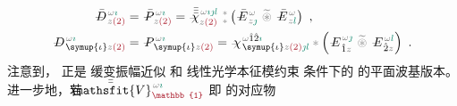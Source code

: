 \begin{subequations} \label{eq:DP^(2)-plane_wave_basis-p_pp}
\begin{align}
	\Xint{\mathcolor{gray}{-}}{30}{\bar{D}}^{\;\! \mathcolor{gray}{\omega} \textcolor{PineGreen}{\imath}}_{\;\! \mathcolor{gray}{z} \textcolor{Maroon}{(2)}} &= \Xint{\mathcolor{gray}{-}}{30}{\bar{P}}^{\;\! \mathcolor{gray}{\omega} \textcolor{PineGreen}{\imath}}_{\;\! \mathcolor{gray}{z} \textcolor{Maroon}{(2)}} = \Xint{{}^{}_{\mathcolor{gray}{-}}}{23}{\bar{\bar{\bar{\chi}}}}^{\;\! \mathcolor{gray}{\omega} \textcolor{PineGreen}{\imath \jmath l}}_{\mathcolor{gray}{z} \textcolor{Maroon}{(2)}} ~{}^{\mathcolor{gray}{*}}_{\mathcolor{gray}{*}} \left( \Xint{\mathcolor{gray}{-}}{295}{\bar{E}}^{\;\!\mathcolor{gray}{\omega}}_{\;\! \mathcolor{gray}{z} \textcolor{PineGreen}{\jmath} } ~\mathcolor{gray}{\widetilde \circledast}~ \Xint{\mathcolor{gray}{-}}{295}{\bar{E}}^{\;\!\mathcolor{gray}{\omega}}_{\;\! \mathcolor{gray}{z} \textcolor{PineGreen}{l} } \right) ~, \label{eq:vec-DP^(2)-plane_wave_basis-p_pp} \\
	\Xint{\mathcolor{gray}{-}}{30}{D}^{\;\! \mathcolor{gray}{\omega} \textcolor{PineGreen}{\imath}}_{\;\! \symup{\iota}\mathcolor{gray}{z} \textcolor{Maroon}{(2)}} &= \Xint{\mathcolor{gray}{-}}{30}{P}^{\;\! \mathcolor{gray}{\omega} \textcolor{PineGreen}{\imath}}_{\;\! \symup{\iota}\mathcolor{gray}{z} \textcolor{Maroon}{(2)}} = \Xint{{}^{}_{\mathcolor{gray}{-}}}{23}{\chi}^{\;\! \mathcolor{gray}{\omega} \hat{1} \hat{2} \textcolor{PineGreen}{\imath}}_{\;\! \symup{\iota} \mathcolor{gray}{z} \textcolor{Maroon}{(2)} \textcolor{PineGreen}{\jmath l}} \mathcolor{gray}{*} \left( \Xint{\mathcolor{gray}{-}}{295}{E}^{\;\!\mathcolor{gray}{\omega} \textcolor{PineGreen}{\jmath}}_{\;\! \hat{1} \mathcolor{gray}{z}} ~\mathcolor{gray}{\widetilde \circledast}~ \Xint{\mathcolor{gray}{-}}{295}{E}^{\;\!\mathcolor{gray}{\omega} \textcolor{PineGreen}{l}}_{\;\! \hat{2} \mathcolor{gray}{z}} \right) ~. \label{eq:components-DP^(2)-plane_wave_basis-p_pp}
\end{align}
\end{subequations}
注意到， 正是 \textcolor{NavyBlue}{缓变振幅近似} 和 \textcolor{PineGreen}{线性光学本征模约束}  条件下的  的\textcolor{PineGreen}{平面波基}版本。进一步地，若 $\Xint{\mathcolor{gray}{-}}{25}{\bar{\bar{\mathsfit{V}}}}^{\;\! \mathcolor{gray}{\omega} \textcolor{PineGreen}{\imath}}_{\textcolor{Maroon}{\mathbb{1}}}$ 
即  的对应物

